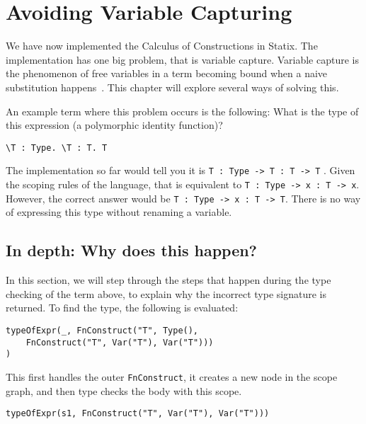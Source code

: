 
\chapter{\label{chap:namecolls}Avoiding Variable Capturing}

We have now implemented the Calculus of Constructions in Statix. The implementation has one big problem, that is variable capture. Variable capture is the phenomenon of free variables in a term becoming bound when a naive substitution happens~\cite{tapl}. This chapter will explore several ways of solving this. 

An example term where this problem occurs is the following: What is the type of this expression (a polymorphic identity function)?
\begin{lstlisting}
\T : Type. \T : T. T
\end{lstlisting}
The implementation so far would tell you it is \verb|T : Type -> T : T -> T| . Given the scoping rules of the language, that is equivalent to \verb|T : Type -> x : T -> x|. However, the correct answer would be \verb|T : Type -> x : T -> T|. There is no way of expressing this type without renaming a variable.

\section{In depth: Why does this happen?}

In this section, we will step through the steps that happen during the type checking of the term above, to explain why the incorrect type signature is returned. To find the type, the following is evaluated:

\begin{lstlisting}
typeOfExpr(_, FnConstruct("T", Type(), 
    FnConstruct("T", Var("T"), Var("T")))
)
\end{lstlisting}

\noindent
This first handles the outer \verb|FnConstruct|, it creates a new node in the scope graph, and then type checks the body with this scope.

\begin{lstlisting}
typeOfExpr(s1, FnConstruct("T", Var("T"), Var("T")))
\end{lstlisting}


